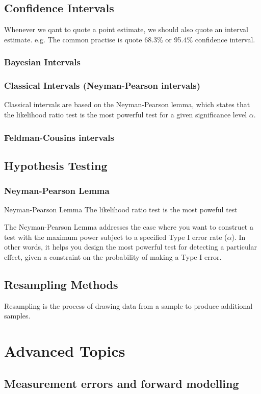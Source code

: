 \documentclass[12pt,a4paper]{article}
\begin{document}
\subsection{Confidence Intervals}
Whenever we qant to quote a point estimate, we should also quote an interval estimate. 
e.g. The common practise is quote 68.3\% or 95.4\% confidence interval.
\subsubsection{Bayesian Intervals}
\subsubsection{Classical Intervals (Neyman-Pearson intervals)}
Classical intervals are based on the Neyman-Pearson lemma, which states that the likelihood ratio test is the most powerful test for a given significance level $\alpha$.
\subsubsection{Feldman-Cousins intervals}   
\subsection{Hypothesis Testing}
\subsubsection{Neyman-Pearson Lemma}
\begin{theorem}
    {Neyman-Pearson Lemma}
    {The likelihood ratio test is the most poweful test }
\end{theorem}

The Neyman-Pearson Lemma addresses the case where you want to construct a test with the maximum power subject to a specified Type I error rate ($\alpha$). In other words, it helps you design the most powerful test for detecting a particular effect, given a constraint on the probability of making a Type I error.
\subsection{Resampling Methods}
Resampling is the process of drawing data from a sample to produce additional samples.
\section{Advanced Topics}
\subsection{Measurement errors and forward modelling}
\end{document}
